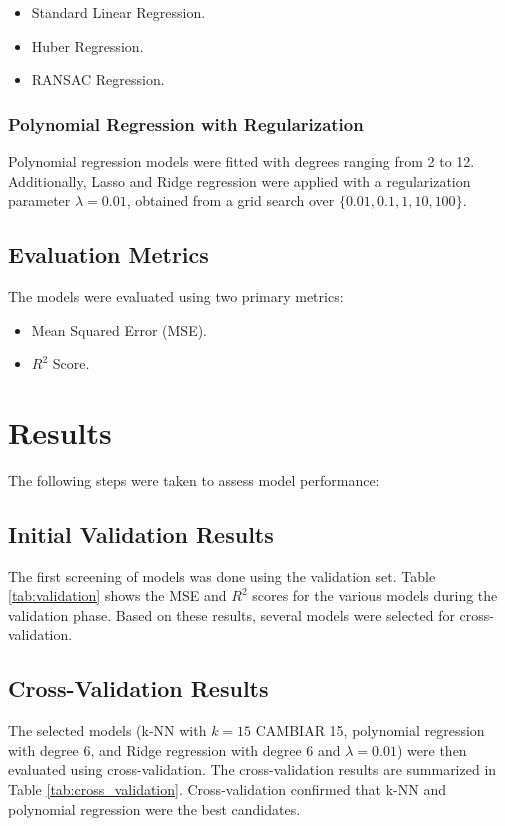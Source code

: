 \documentclass[twocolumn]{article}
\begin{document}
\begin{itemize}
    \item Standard Linear Regression.
    \item Huber Regression.
    \item RANSAC Regression.
\end{itemize}

\subsubsection{Polynomial Regression with Regularization}
Polynomial regression models were fitted with degrees ranging from 2 to 12. Additionally, 
Lasso and Ridge regression were applied with a regularization parameter \( \lambda = 0.01 \), 
obtained from a grid search over \( \{0.01, 0.1, 1, 10, 100\} \). 

\subsection{Evaluation Metrics}
The models were evaluated using two primary metrics:
\begin{itemize}
    \item Mean Squared Error (MSE).
    \item \( R^2 \) Score.
\end{itemize}


\section{Results}

The following steps were taken to assess model performance:

\subsection{Initial Validation Results}
The first screening of models was done using the validation set. Table \ref{tab:validation} shows the MSE and \( R^2 \) 
scores for the various models during the validation phase. Based on these results, several models were selected 
for cross-validation.



\subsection{Cross-Validation Results}
The selected models (k-NN with \(k=15\) CAMBIAR 15, polynomial regression with degree 6, and Ridge regression with degree 6 and \(\lambda = 0.01\)) were then evaluated using cross-validation. 
The cross-validation results are summarized in Table \ref{tab:cross_validation}. 
Cross-validation confirmed that k-NN and polynomial regression were the best candidates.
\end{document}
